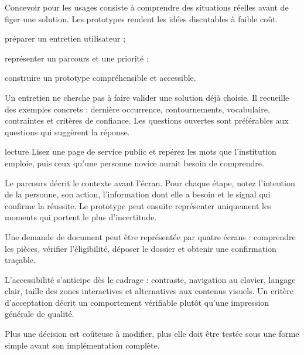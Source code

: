 \documentclass[12pt,twoside]{upbcours}
\begin{document}
\introduction
\begin{survol}
  Concevoir pour les usages consiste à comprendre des situations réelles avant de figer une
  solution. Les prototypes rendent les idées discutables à faible coût.
\end{survol}
\begin{objectifs}
  \item préparer un entretien utilisateur ;
  \item représenter un parcours et une priorité ;
  \item construire un prototype compréhensible et accessible.
\end{objectifs}
\begin{concepts}
\end{concepts}
Un entretien ne cherche pas à faire valider une solution déjà choisie. Il recueille des exemples
concrets : dernière occurrence, contournements, vocabulaire, contraintes et critères de confiance.
Les questions ouvertes sont préférables aux questions qui suggèrent la réponse.
\begin{icone}{lecture}
  Lisez une page de service public et repérez les mots que l'institution emploie, puis ceux
  qu'une personne novice aurait besoin de comprendre.
\end{icone}
Le parcours décrit le contexte avant l'écran. Pour chaque étape, notez l'intention de la personne,
son action, l'information dont elle a besoin et le signal qui confirme la réussite. Le prototype
peut ensuite représenter uniquement les moments qui portent le plus d'incertitude.
\begin{exemple}
  Une demande de document peut être représentée par quatre écrans : comprendre les pièces,
  vérifier l'éligibilité, déposer le dossier et obtenir une confirmation traçable.
\end{exemple}
L'accessibilité s'anticipe dès le cadrage : contraste, navigation au clavier, langage clair,
taille des zones interactives et alternatives aux contenus visuels. Un critère d'acceptation décrit
un comportement vérifiable plutôt qu'une impression générale de qualité.
\begin{theoreme}
  Plus une décision est coûteuse à modifier, plus elle doit être testée sous une forme simple
  avant son implémentation complète.
\end{theoreme}
\end{document}
